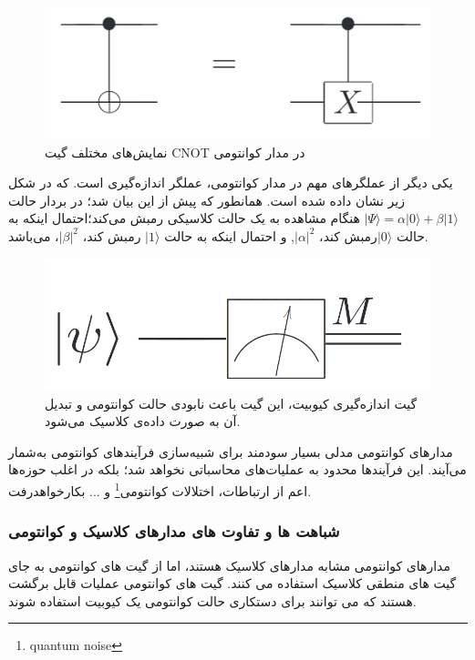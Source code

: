 \documentclass{book}
\begin{document}
\begin{figure}[htbp]
	\centering
	\includegraphics[width=\linewidth]{cnot in circuit.png}
	\caption{نمایش‌های مختلف گیت CNOT در مدار کوانتومی}
	\label{fig:my_image}
\end{figure}

یکی دیگر از عملگر‌های مهم در مدار کوانتومی، عملگر اندازه‌گیری است. که در شکل زیر نشان داده شده است. همانطور که پیش از این بیان شد؛ در بردار حالت $\vert \Psi \rangle = \alpha \vert 0 \rangle + \beta \vert 1 \rangle$ هنگام مشاهده به یک حالت کلاسیکی رمبش می‌کند؛‌احتمال اینکه به حالت $\vert 0 \rangle$رمبش کند، $\vert \alpha \vert ^2$, و احتمال اینکه به حالت $\vert 1 \rangle$ رمبش کند، $\vert \beta \vert ^2$، می‌باشد.

 
\begin{figure}[ht]
	\centering
	\includegraphics[width=\linewidth, scale=0.5]{measurment.png}
	\caption{گیت اندازه‌گیری کیوبیت، این گیت باعث نابودی حالت کوانتومی و تبدیل آن به صورت داده‌ی کلاسیک می‌شود.}
	\label{fig:my_image}
\end{figure}


مدار‌های کوانتومی مدلی بسیار سودمند برای شبیه‌سازی‌ فرآیندهای کوانتومی‌ به‌شمار می‌آیند. این فرآیندها محدود به عملیات‌های محاسباتی نخواهد شد؛ بلکه در اغلب حوزه‌‌ها اعم از ارتباطات، اختلالات کوانتومی\footnote{quantum noise} و ... بکار‌خواهدرفت.
\subsubsection{شباهت ها و تفاوت های مدارهای کلاسیک و کوانتومی}
مدارهای کوانتومی مشابه مدارهای کلاسیک هستند، اما از گیت های کوانتومی به جای گیت های منطقی کلاسیک استفاده می کنند. گیت های کوانتومی عملیات قابل برگشت هستند که می توانند برای دستکاری حالت کوانتومی یک کیوبیت استفاده شوند.
\end{document}
